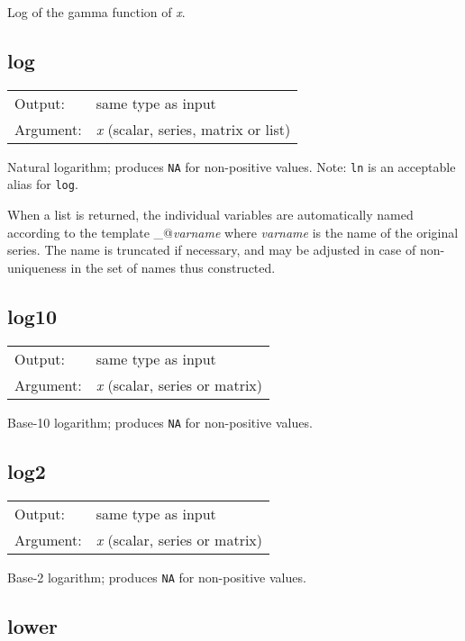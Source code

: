 	  Log of the gamma function of \textsl{x}.

\subsection{log}
\hypertarget{func-log}{}

\begin{tabular}{ll}
Output:     & same type as input\\
Argument:   & \textsl{x} (scalar, series, matrix or list)\\
\end{tabular}

	  Natural logarithm; produces \texttt{NA} for non-positive
	  values. Note: \texttt{ln} is an acceptable alias for
	  \texttt{log}.

	  When a list is returned, the individual variables are
	  automatically named according to the template
	  \verb@l_@\textsl{varname} where \textsl{varname} is the
	  name of the original series.  The name is truncated if necessary,
	  and may be adjusted in case of non-uniqueness in the set of names
	  thus constructed.

\subsection{log10}
\hypertarget{func-log10}{}

\begin{tabular}{ll}
Output:     & same type as input\\
Argument:   & \textsl{x} (scalar, series or matrix)\\
\end{tabular}

	  Base-10 logarithm; produces \texttt{NA} for non-positive
	  values.

\subsection{log2}
\hypertarget{func-log2}{}

\begin{tabular}{ll}
Output:     & same type as input\\
Argument:   & \textsl{x} (scalar, series or matrix)\\
\end{tabular}

	  Base-2 logarithm; produces \texttt{NA} for non-positive
	  values.

\subsection{lower}
\hypertarget{func-lower}{}

